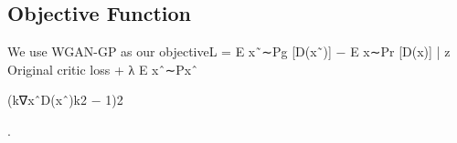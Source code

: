 \subsection{Objective Function}
We use WGAN-GP as our objectiveL = E
x˜∼Pg
[D(x˜)] − E
x∼Pr
[D(x)]
| {z }
Original critic loss
+ λ E
xˆ∼Pxˆ

(k∇xˆD(xˆ)k2 − 1)2

. 